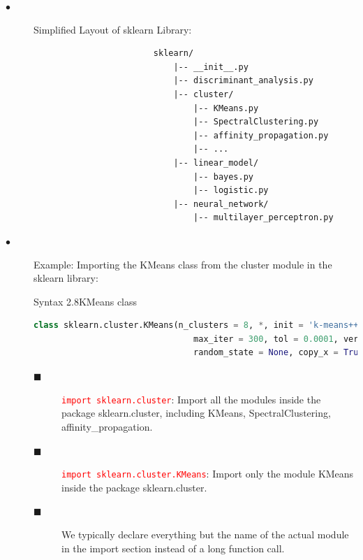 \documentclass{book}
\begin{document}
\begin{description}
    \item[$\bullet$] Simplified Layout of sklearn Library:
    \begin{lstlisting}
                        sklearn/
                            |-- __init__.py
                            |-- discriminant_analysis.py
                            |-- cluster/
                                |-- KMeans.py
                                |-- SpectralClustering.py
                                |-- affinity_propagation.py
                                |-- ...
                            |-- linear_model/
                                |-- bayes.py
                                |-- logistic.py
                            |-- neural_network/
                                |-- multilayer_perceptron.py
    \end{lstlisting}
    \newpage
    \item[$\bullet$] Example: Importing the KMeans class from the cluster module in the sklearn library:\\
    \begin{synBox}{Syntax 2.8}{KMeans class}
        \begin{lstlisting}[language=Python, basicstyle=\ttfamily\small, keywordstyle=\color{blue}, commentstyle=\color{forestgreen}, stringstyle=\color{red}, showstringspaces=false]
    class sklearn.cluster.KMeans(n_clusters = 8, *, init = 'k-means++', n_init = 10,
                                max_iter = 300, tol = 0.0001, verbose = 0,
                                random_state = None, copy_x = True, algorithm = 'auto')
        \end{lstlisting}
    \end{synBox}
    \begin{description}
        \item[$\blacksquare$] \textcolor{red}{\texttt{import sklearn.cluster}}: Import all the modules inside the package sklearn.cluster, including KMeans, SpectralClustering, affinity\_propagation.
        \item[$\blacksquare$] \textcolor{red}{\texttt{import sklearn.cluster.KMeans}}: Import only the module KMeans inside the package sklearn.cluster.
        \item[$\blacksquare$] We typically declare everything but the name of the actual module in the import section instead of a long function call.
        \begin{lstlisting}[language=Python, basicstyle=\ttfamily\small, keywordstyle=\color{blue}, commentstyle=\color{forestgreen}, stringstyle=\color{red}, showstringspaces=false]

\end{lstlisting}
\end{description}
\end{description}
\end{document}
